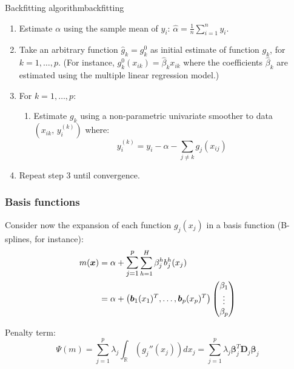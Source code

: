\begin{definition}{Backfitting algorithm}{backfitting}
    \begin{enumerate}
        \item Estimate $\alpha$ using the sample mean of $y_i$: $\hat \alpha = \frac{1}{n} \sum_{i=1}^n y_i$.
        \item Take an arbitrary function $\hat g_k = g_k^0$ as initial estimate of function $g_k$,
            for $k = 1,\dots,p$. (For instance, $g_k^0(x_{ik}) = \hat \beta_k x_{ik}$ where
            the coefficients $\hat \beta_k$ are estimated using the multiple linear regression model.)
        \item For $k = 1,\dots,p$:
            \begin{enumerate}
                \item Estimate $g_k$ using a non-parametric univariate smoother
                    to data $(x_{ik},\, y_i^{(k)})$ where:
                    \begin{equation*}
                        y_i^{(k)} = y_i - \alpha - \sum_{j \neq k} g_j(x_{ij})
                    \end{equation*}
            \end{enumerate}
        \item Repeat step 3 until convergence.
    \end{enumerate}
\end{definition}

\subsubsection{Basis functions}

Consider now the expansion of each function $g_j(x_j)$ in a basis function
(B-splines, for instance):
\begin{align*}
    m(\boldsymbol x) &= \alpha + \mathlarger{\sum_{j=1}^p} \sum_{h=1}^H \beta_j^h b_j^h(x_j) \\
        &= \alpha + \left(
            \boldsymbol b_1(x_1)^T, \ldots, \boldsymbol b_p(x_p)^T
        \right) \begin{pmatrix}
            \beta_1 \\
            \vdots \\
            \beta_p
        \end{pmatrix}
\end{align*}

Penalty term:
\begin{equation*}
    \Psi(m) = \sum_{j=1}^p \lambda_j \int_{\mathds R} \left( g_j'' (x_j) \right) dx_j
        = \sum_{j=1}^p \lambda_j \boldsymbol\beta_j^T \boldsymbol D_j \boldsymbol\beta_j
\end{equation*}

